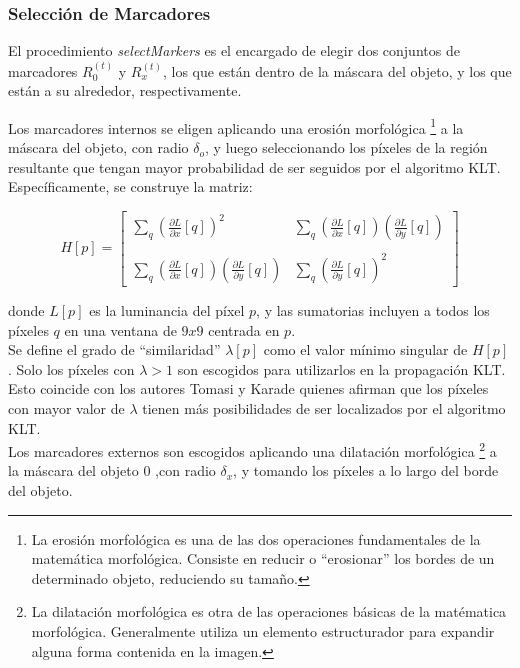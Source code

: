 \documentclass[a4paper,10pt]{article}
\begin{document}
\subsubsection{Selección de Marcadores}
El procedimiento \textit{selectMarkers} es el encargado de elegir dos conjuntos
de marcadores $R_{0}^{(t)}$ y $R_{x}^{(t)}$, los que están dentro de la máscara del objeto, y los que están a
su alrededor, respectivamente.

Los marcadores internos se eligen aplicando una erosión morfológica
\footnote{La erosión morfológica es una de las dos operaciones fundamentales de la matemática morfológica. Consiste
en reducir o ``erosionar'' los bordes de un determinado objeto, reduciendo su tamaño. }
 a la máscara del objeto, con radio $\delta_{o}$, y
luego seleccionando los píxeles de la región resultante que tengan mayor probabilidad
de ser seguidos por el algoritmo KLT. Específicamente, se construye la matriz:

\begin{equation}
    H[p] = \left[\begin{array}{cc}
                \sum_{q}(\frac{\partial L}{\partial x}[q])^2 & \sum_{q}(\frac{\partial L}{\partial x}[q])(\frac{\partial L}{\partial y}[q]) \\
                & \\
                \sum_{q}(\frac{\partial L}{\partial x}[q])(\frac{\partial L}{\partial y}[q]) & \sum_{q}(\frac{\partial L}{\partial y}[q])^2 \end{array}\right]
    \label{IFTrace-matrix-H}
\end{equation}


\noindent donde $L[p]$ es la luminancia del píxel $p$, y las sumatorias incluyen a todos los
píxeles $q$ en una ventana de $9x9$ centrada en $p$.\\
Se define el grado de ``similaridad'' $\lambda[p]$ como el valor mínimo singular de $H[p]$.
Solo los píxeles con $\lambda > 1$ son escogidos para utilizarlos en la
propagación KLT. Esto coincide con los autores Tomasi y Karade \cite{Tomasi91detectionand}
quienes afirman que los píxeles con mayor valor de $\lambda$ tienen más posibilidades
de ser localizados por el algoritmo KLT.\\
Los marcadores externos son escogidos aplicando una dilatación morfológica
\footnote{La dilatación morfológica es otra de las operaciones  básicas de la matématica morfológica. Generalmente utiliza un elemento
estructurador para expandir alguna forma contenida en la imagen.}
a la máscara del objeto $0$
,con radio $\delta_{x}$, y tomando los píxeles a lo largo del borde del objeto.
\end{document}
